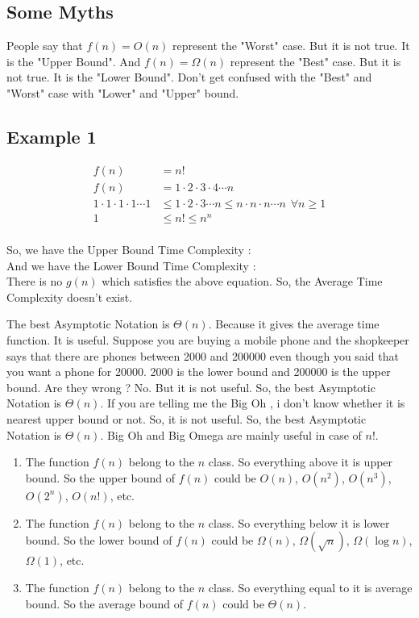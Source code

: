 \documentclass[]{article}
\begin{document}
\subsection{Some Myths}

People say that $f(n) = O(n)$ represent the "Worst" case. But it is not true. It is the "Upper Bound". And $f(n) = \Omega(n)$ represent the "Best" case. But it is not true. It is the "Lower Bound".
\newline
Don't get confused with the "Best" and "Worst" case with "Lower" and "Upper" bound.

\subsection{ Example 1}
\[
\begin{aligned}
    f(n) &= n! \\
    f(n) &= 1 \cdot 2 \cdot 3 \cdot 4 \cdots n \\
    1 \cdot 1 \cdot 1 \cdot 1 \cdots 1 &\leq 1 \cdot 2 \cdot 3 \cdots n \leq n \cdot n \cdot n \cdots n \hspace{5pt} \forall n \geq 1 \\
    1 &\leq n! \leq n^n \\
\end{aligned}
\]

So, we have the Upper Bound Time Complexity :   \\
And we have the Lower Bound Time Complexity :   \\
There is no $g(n)$ which satisfies the above equation. So, the Average Time Complexity doesn't exist.


The best Asymptotic Notation is $\Theta(n)$. Because it gives the average time function. It is useful.
Suppose you are buying a mobile phone and the shopkeeper says that there are phones between 2000 and 200000 even though you said that you want a phone for 20000. 2000 is the lower bound and 200000 is the upper bound. Are they wrong
? No. But it is not useful. So, the best Asymptotic Notation is $\Theta(n)$. 
If you are telling me the Big Oh , i don't know whether it is nearest upper bound or not. So, it is not useful. So, the best Asymptotic Notation is $\Theta(n)$.
Big Oh and Big Omega are mainly useful in case of $n!$.

\begin{enumerate}
    \item The function $f(n)$ belong to the $n$ class. So everything above it is upper bound. So the upper bound of $f(n)$ could be $O(n)$, $O(n^2)$, $O(n^3)$, $O(2^n)$, $O(n!)$, etc.

    \item The function $f(n)$ belong to the $n$ class. So everything below it is lower bound. So the lower bound of $f(n)$ could be $\Omega(n)$, $\Omega(\sqrt{n})$, $\Omega(\log{n})$, $\Omega(1)$, etc.

    \item The function $f(n)$ belong to the $n$ class. So everything equal to it is average bound. So the average bound of $f(n)$ could be $\Theta(n)$.
\end{enumerate}
\end{document}

